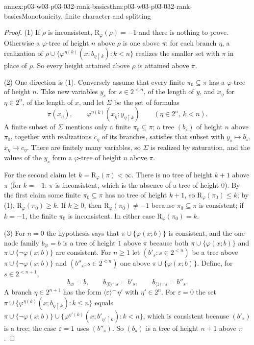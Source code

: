 \begin{annexitem}{annex:p03-w03-p03-032-rank-basics}{thm:p03-w03-p03-032-rank-basics}{Monotonicity, finite character and splitting}
\begin{proof}
(1) If \(\rho\) is inconsistent, \(\mathrm R_\varphi(\rho)=-1\) and there is
nothing to prove.  Otherwise a \(\varphi\)-tree of height \(n\) above
\(\rho\) is one above \(\pi\): for each branch \(\eta\), a realization of
\(\rho\cup\{\varphi^{\eta(k)}(x;b_{\eta\mathbin{\upharpoonright}k}):k<n\}\)
realizes the smaller set with \(\pi\) in place of \(\rho\).  So every height
attained above \(\rho\) is attained above \(\pi\).

(2) One direction is (1).  Conversely assume that every finite
\(\pi_0\subseteq\pi\) has a \(\varphi\)-tree of height \(n\).  Take new
variables \(y_s\) for \(s\in2^{<n}\), of the length of \(y\), and \(x_\eta\)
for \(\eta\in2^n\), of the length of \(x\), and let \(\Sigma\) be the set of
formulas
\[
  \pi(x_\eta),\qquad
  \varphi^{\eta(k)}(x_\eta;y_{\eta\mathbin{\upharpoonright}k})
  \qquad(\eta\in2^n,\ k<n).
\]
A finite subset of \(\Sigma\) mentions only a finite \(\pi_0\subseteq\pi\);
a tree \((b_s)\) of height \(n\) above \(\pi_0\), together with realizations
\(c_\eta\) of its branches, satisfies that subset with \(y_s\mapsto b_s\),
\(x_\eta\mapsto c_\eta\).  There are finitely many variables, so \(\Sigma\)
is realized by saturation, and the values of the \(y_s\) form a
\(\varphi\)-tree of height \(n\) above \(\pi\).

For the second claim let \(k=\mathrm R_\varphi(\pi)<\infty\).  There is no
tree of height \(k+1\) above \(\pi\) (for \(k=-1\): \(\pi\) is inconsistent,
which is the absence of a tree of height \(0\)).  By the first claim some
finite \(\pi_0\subseteq\pi\) has no tree of height \(k+1\), so
\(\mathrm R_\varphi(\pi_0)\leq k\); by (1),
\(\mathrm R_\varphi(\pi_0)\geq k\).  If \(k\geq0\), then
\(\mathrm R_\varphi(\pi_0)\neq-1\) because \(\pi_0\subseteq\pi\) is
consistent; if \(k=-1\), the finite \(\pi_0\) is inconsistent.  In either
case \(\mathrm R_\varphi(\pi_0)=k\).

(3) For \(n=0\) the hypothesis says that \(\pi\cup\{\varphi(x;b)\}\) is
consistent, and the one-node family \(b_\varnothing=b\) is a tree of height
\(1\) above \(\pi\) because both \(\pi\cup\{\varphi(x;b)\}\) and
\(\pi\cup\{\neg\varphi(x;b)\}\) are consistent.  For \(n\geq1\) let
\((b'_s:s\in2^{<n})\) be a tree above \(\pi\cup\{\neg\varphi(x;b)\}\) and
\((b''_s:s\in2^{<n})\) one above \(\pi\cup\{\varphi(x;b)\}\).  Define, for
\(s\in2^{<n+1}\),
\[
  b_\varnothing=b,\qquad b_{\langle0\rangle^\frown s}=b'_s,\qquad
  b_{\langle1\rangle^\frown s}=b''_s .
\]
A branch \(\eta\in2^{n+1}\) has the form \(\langle\varepsilon\rangle^\frown
\eta'\) with \(\eta'\in2^n\).  For \(\varepsilon=0\) the set
\(\pi\cup\{\varphi^{\eta(k)}(x;b_{\eta\mathbin{\upharpoonright}k}):k\leq n\}\)
equals \(\pi\cup\{\neg\varphi(x;b)\}\cup
\{\varphi^{\eta'(k)}(x;b'_{\eta'\mathbin{\upharpoonright}k}):k<n\}\), which is
consistent because \((b'_s)\) is a tree; the case \(\varepsilon=1\) uses
\((b''_s)\).  So \((b_s)\) is a tree of height \(n+1\) above \(\pi\).
\end{proof}
\end{annexitem}

